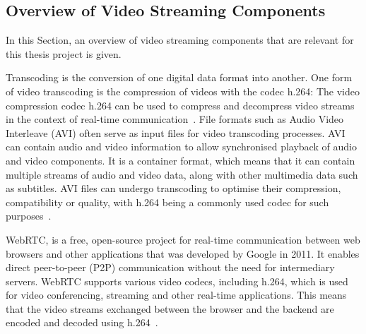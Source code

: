 \documentclass[../MasterThesis.tex]{subfiles}
\begin{document}
\subsection{Overview of Video Streaming Components}
\label{subsection_OverviewVideoStreamingComponents}

In this Section, an overview of video streaming components that are relevant for this thesis project is given.

Transcoding is the conversion of one digital data format into another.
One form of video transcoding is the compression of videos with the codec h.264:
The video compression codec h.264 can be used to compress and decompress video streams in the context of real-time communication~\cite{transcoding, h264}.
%	
File formats such as Audio Video Interleave (AVI) often serve as input files for video transcoding processes.
AVI can contain audio and video information to allow synchronised playback of audio and video components. 
It is a container format, which means that it can contain multiple streams of audio and video data, along with other multimedia data such as subtitles.
AVI files can undergo transcoding to optimise their compression, compatibility or quality, with h.264 being a commonly used codec for such purposes~\cite{avi, h264}.


WebRTC, is a free, open-source project for real-time communication between web browsers and other applications that was developed by Google in 2011. It enables direct peer-to-peer (P2P) communication without the need for intermediary servers.
WebRTC supports various video codecs, including h.264, which is used for video conferencing, streaming and other real-time applications. This means that the video streams exchanged between the browser and the backend are encoded and decoded using h.264~\cite{webrtc, h264}.





\end{document}
